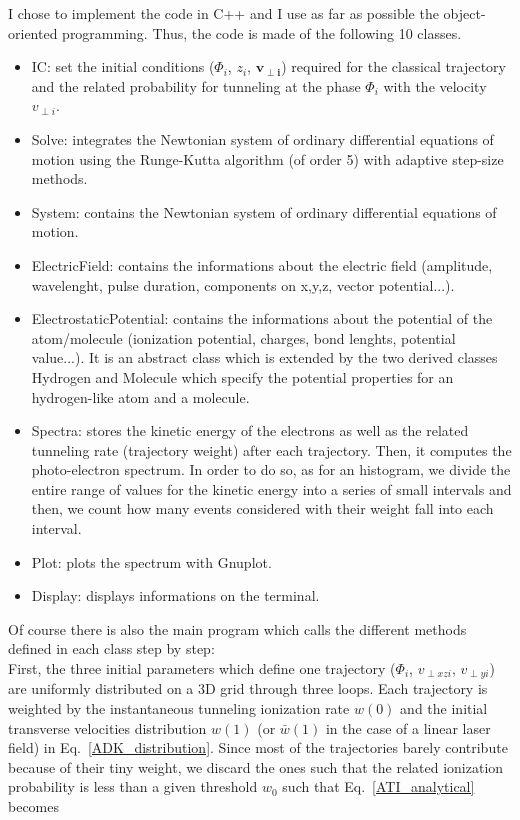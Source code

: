 \documentclass[a4paper]{article}
\begin{document}
I chose to implement the code in C++ and I use as far as possible the object-oriented programming. Thus, the code is made of the following 10 classes.
\begin{itemize}
\item
IC: set the initial conditions ($\Phi_{i}$, $z_{i}$, $\mathbf{v_{\perp i}}$) required for the classical trajectory and the related probability for tunneling at the phase $\Phi_{i}$ with the velocity $v_{\perp i}$.
\item
Solve: integrates the Newtonian system of ordinary differential equations of motion using the Runge-Kutta algorithm (of order 5) with adaptive step-size methods.
\item
System: contains the Newtonian system of ordinary differential equations of motion.
\item
ElectricField: contains the informations about the electric field (amplitude, wavelenght, pulse duration, components on x,y,z, vector potential...).
\item
ElectrostaticPotential: contains the informations about the potential of the atom/molecule (ionization potential, charges, bond lenghts, potential value...). It is an abstract class which is extended by the two derived classes Hydrogen and Molecule which specify the potential properties for an hydrogen-like atom and a molecule. 
\item
Spectra: stores the kinetic energy of the electrons as well as the related tunneling rate (trajectory weight) after each trajectory. Then, it computes the photo-electron spectrum. In order to do so, as for an histogram, we divide the entire range of values for the kinetic energy into a series of small intervals and then, we count how many events considered with their weight fall into each interval.
\item
Plot: plots the spectrum with Gnuplot.
\item
Display: displays informations on the terminal. 
\end{itemize}
\par
Of course there is also the main program which calls the different methods defined in each class step by step: \\
First, the three initial parameters which define one trajectory ($\Phi_{i}$, $v_{\perp xz i}$, $v_{\perp y i}$) are uniformly distributed on a 3D grid through three loops. Each trajectory is weighted by the instantaneous tunneling ionization rate $w (0)$ and the initial transverse velocities distribution $w (1)$ (or $\bar w(1)$ in the case of a linear laser field) in Eq.~\eqref{ADK_distribution}. Since most of the trajectories barely contribute because of their tiny weight, we discard the ones such that the related ionization probability is less than a given threshold $w_{0}$ such that Eq.~\eqref{ATI_analytical} becomes
\end{document}
